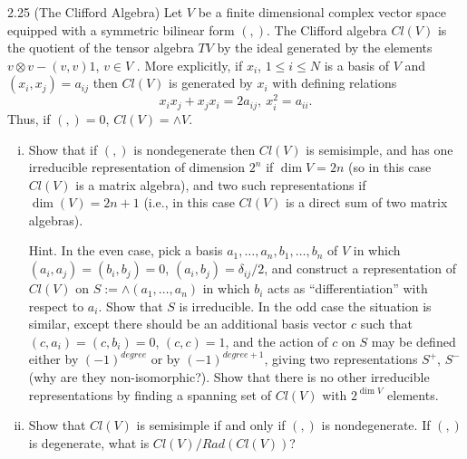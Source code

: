 \documentclass[twoside]{article}
\begin{document}
\newpage
\begin{ejercicio}{2.25 (The Clifford Algebra)}
Let $V$ be a finite dimensional complex vector space
equipped with a symmetric bilinear form $(, )$. The Clifford algebra $Cl(V )$ is the quotient of the
tensor algebra $TV$ by the ideal generated by the elements $v ⊗ v −(v, v)1$, $v ∈ V$ . More explicitly, if
$x_i$, $1 ≤ i ≤ N$ is a basis of $V$ and $(x_i, x_j) = a_{ij}$ then $Cl(V )$ is generated by $x_i$ with defining relations
$$x_ix_j + x_jx_i = 2a_{ij} ,\ x^2_i = a_{ii}.$$
Thus, if $(, ) = 0$, $Cl(V ) = ∧V $.

\begin{enumerate}[(i)]
\item Show that if $(, )$ is nondegenerate then $Cl(V )$ is semisimple, and has one irreducible representation
of dimension $2^n$ if $\dim V = 2n$ (so in this case $Cl(V )$ is a matrix algebra), and two such
representations if $\dim(V ) = 2n+1$ (i.e., in this case $Cl(V )$ is a direct sum of two matrix algebras).

Hint. In the even case, pick a basis $a_1, \dots, a_n, b_1,\dots , b_n$ of $V$ in which $(a_i, a_j) = (b_i, b_j) = 0$,
$(a_i, b_j) = δ_{ij}/2$, and construct a representation of $Cl(V )$ on $S := ∧(a_1, \dots, a_n)$ in which $b_i$ acts as
“differentiation” with respect to $a_i$. Show that $S$ is irreducible. In the odd case the situation is
similar, except there should be an additional basis vector $c$ such that $(c, a_i) = (c, b_i) = 0$, $(c, c) =
1$, and the action of $c$ on $S$ may be defined either by $(−1)^{degree}$ or by $(−1)^{degree+1}$, giving two
representations $S^+$, $S^−$ (why are they non-isomorphic?). Show that there is no other irreducible
representations by finding a spanning set of $Cl(V )$ with $2^{\dim V}$ elements.

\item Show that $Cl(V )$ is semisimple if and only if $(, )$ is nondegenerate. If $(, )$ is degenerate, what
is $Cl(V )/Rad(Cl(V ))$?
\end{enumerate}
\end{ejercicio}
\begin{solucion}
\end{solucion}\
\end{document}
